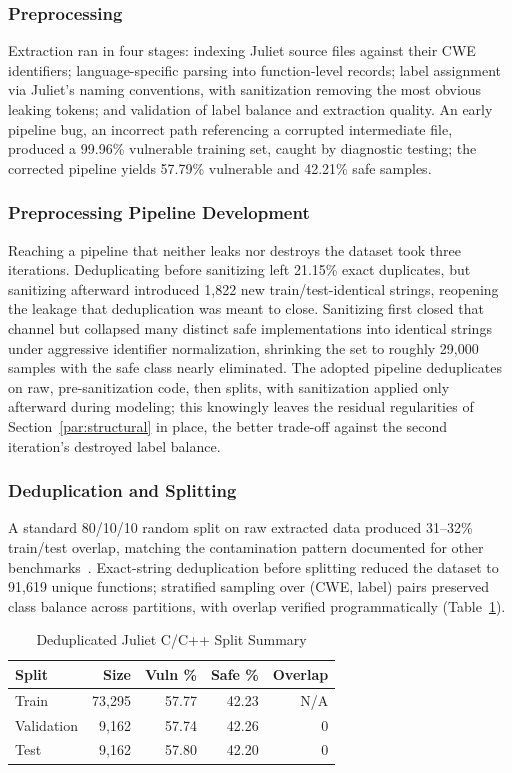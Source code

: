 \documentclass{ieeeaccess}
\begin{document}
\subsubsection{Preprocessing}
\label{par:preproc}
Extraction ran in four stages: indexing Juliet source files against their CWE identifiers; language-specific parsing into function-level records; label assignment via Juliet's naming conventions, with sanitization removing the most obvious leaking tokens; and validation of label balance and extraction quality. An early pipeline bug, an incorrect path referencing a corrupted intermediate file, produced a 99.96\% vulnerable training set, caught by diagnostic testing; the corrected pipeline yields 57.79\% vulnerable and 42.21\% safe samples.

\subsubsection{Preprocessing Pipeline Development}
\label{par:pipeline-dev}
Reaching a pipeline that neither leaks nor destroys the dataset took three iterations. Deduplicating before sanitizing left 21.15\% exact duplicates, but sanitizing afterward introduced 1{,}822 new train/test-identical strings, reopening the leakage that deduplication was meant to close. Sanitizing first closed that channel but collapsed many distinct safe implementations into identical strings under aggressive identifier normalization, shrinking the set to roughly 29{,}000 samples with the safe class nearly eliminated. The adopted pipeline deduplicates on raw, pre-sanitization code, then splits, with sanitization applied only afterward during modeling; this knowingly leaves the residual regularities of Section~\ref{par:structural} in place, the better trade-off against the second iteration's destroyed label balance.

\subsubsection{Deduplication and Splitting}
\label{par:dedup}
A standard 80/10/10 random split on raw extracted data produced 31--32\% train/test overlap, matching the contamination pattern documented for other benchmarks~\cite{ref1}. Exact-string deduplication before splitting reduced the dataset to 91{,}619 unique functions; stratified sampling over (CWE, label) pairs preserved class balance across partitions, with overlap verified programmatically (Table~\ref{tab:dedup-split}).

\begin{table}[t]
\centering
\caption{Deduplicated Juliet C/C++ Split Summary}
\label{tab:dedup-split}
\begin{tabular}{@{}lrrrr@{}}
\toprule
\textbf{Split} & \textbf{Size} & \textbf{Vuln \%} & \textbf{Safe \%} & \textbf{Overlap} \\
\midrule
Train      & 73{,}295 & 57.77 & 42.23 & N/A \\
Validation &  9{,}162 & 57.74 & 42.26 & 0 \\
Test       &  9{,}162 & 57.80 & 42.20 & 0 \\
\bottomrule
\end{tabular}
\end{table}
\end{document}
